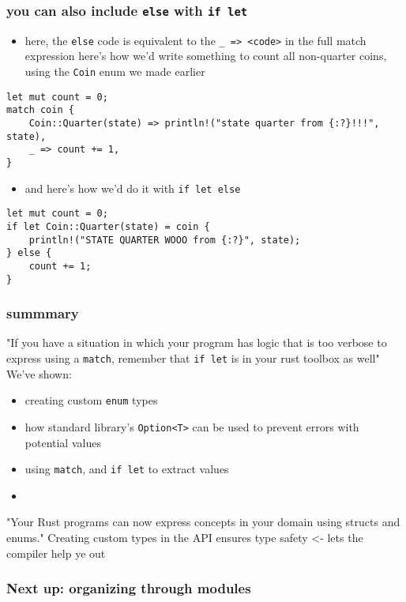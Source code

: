 \documentclass[11pt]{article}
\begin{document}
\subsubsection{you can also include \texttt{else} with \texttt{if let}}
\label{sec:org4b60506}
\begin{itemize}
\item here, the \texttt{else} code is equivalent to the \texttt{\_ => <code>} in the full match expression
here's how we'd write something to count all non-quarter coins, using the \texttt{Coin} enum we made earlier
\end{itemize}
\begin{verbatim}
let mut count = 0;
match coin {
    Coin::Quarter(state) => println!("state quarter from {:?}!!!", state),
    _ => count += 1,
}
\end{verbatim}
\begin{itemize}
\item and here's how we'd do it with \texttt{if let else}
\end{itemize}
\begin{verbatim}
let mut count = 0;
if let Coin::Quarter(state) = coin {
    println!("STATE QUARTER WOOO from {:?}", state);
} else {
    count += 1;
}
\end{verbatim}

\subsubsection{summmary}
\label{sec:org6f7066c}
"If you have a situation in which your program has logic that is too verbose to express using a \texttt{match}, remember that \texttt{if let} is in your rust toolbox as well"
We've shown:
\begin{itemize}
\item creating custom \texttt{enum} types
\item how standard library's \texttt{Option<T>} can be used to prevent errors with potential values
\item using \texttt{match}, and \texttt{if let} to extract values
\item 
\end{itemize}
"Your Rust programs can now express concepts in your domain using structs and enums."
Creating custom types in the API ensures type safety <- lets the compiler help ye out

\subsubsection{Next up: organizing through modules}
\label{sec:org5ed98b8}
\end{document}
